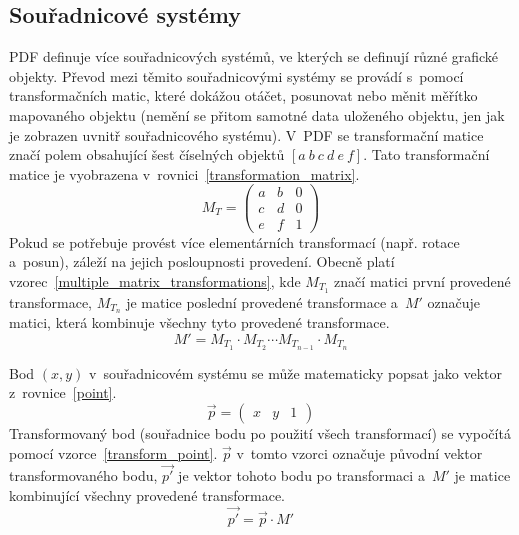 \subsection*{Souřadnicové systémy}
PDF definuje více souřadnicových systémů, ve kterých se definují různé grafické
objekty. Převod mezi těmito souřadnicovými systémy se provádí s~pomocí
transformačních matic, které dokážou otáčet, posunovat nebo měnit měřítko
mapovaného objektu (nemění se přitom samotné data uloženého objektu, jen jak je
zobrazen uvnitř souřadnicového systému). V~PDF se transformační matice značí polem
obsahující šest číselných objektů $[a~b~c~d~e~f]$. Tato transformační matice je
vyobrazena v~rovnici~\eqref{transformation_matrix}.
\begin{equation}\label{transformation_matrix}
    M_T = 
    \begin{pmatrix}
        a & b & 0 \\
        c & d & 0 \\
        e & f & 1
    \end{pmatrix}
\end{equation}
Pokud se potřebuje provést více elementárních transformací 
(např. rotace a~posun), záleží na jejich posloupnosti provedení. Obecně
platí vzorec~\eqref{multiple_matrix_transformations}, kde $M_{T_1}$ značí matici
první provedené transformace, $M_{T_n}$ je matice poslední provedené transformace
a~$M'$ označuje matici, která kombinuje všechny tyto provedené transformace.
\begin{equation} \label{multiple_matrix_transformations}
    M' = M_{T_1} \cdot M_{T_2} \cdots M_{T_{n-1}} \cdot M_{T_n}
\end{equation}

Bod $(x, y)$ v~souřadnicovém systému se může matematicky popsat jako vektor
z~rovnice~\eqref{point}.
\begin{equation}\label{point}
    \overrightarrow{p}  = 
    \begin{pmatrix}
        x & y & 1
    \end{pmatrix}
\end{equation}
Transformovaný bod (souřadnice bodu po použití všech transformací) se vypočítá
pomocí vzorce~\eqref{transform_point}. $\overrightarrow{p}$ v~tomto vzorci označuje původní vektor
transformovaného bodu, $\overrightarrow{p'}$ je vektor tohoto bodu po transformaci a~$M'$ je matice
kombinující všechny provedené transformace.
\begin{equation} \label{transform_point}
    \overrightarrow{p'} = \overrightarrow{p} \cdot M'
\end{equation}

